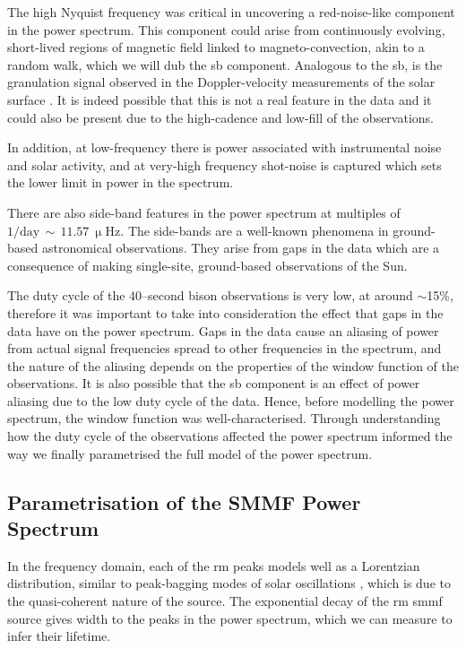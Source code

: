 The high Nyquist frequency was critical in uncovering a red-noise-like component in the power spectrum. This component could arise from continuously evolving, short-lived regions of magnetic field linked to magneto-convection, akin to a random walk, which we will dub the \gls{sb} component. Analogous to the \gls{sb}, is the granulation signal observed in the Doppler-velocity measurements of the solar surface \citep{basu_asteroseismic_2017}. It is indeed possible that this is not a real feature in the data and it could also be present due to the high-cadence and low-fill of the observations.

In addition, at low-frequency there is power associated with instrumental noise and solar activity, and at very-high frequency shot-noise is captured which sets the lower limit in power in the spectrum. 

There are also side-band features in the power spectrum at multiples of $1/\mathrm{day}\,\sim\,11.57~\upmu\mathrm{Hz}$. The side-bands are a well-known phenomena in ground-based astronomical observations. They arise from gaps in the data which are a consequence of making single-site, ground-based observations of the Sun.

The duty cycle of the 40--second \gls{bison} observations is very low, at around $\sim$15\%, therefore it was important to take into consideration the effect that gaps in the data have on the power spectrum. Gaps in the data cause an aliasing of power from actual signal frequencies spread to other frequencies in the spectrum, and the nature of the aliasing depends on the properties of the window function of the observations. It is also possible that the \gls{sb} component is an effect of power aliasing due to the low duty cycle of the data. Hence, before modelling the power spectrum, the window function was well-characterised. Through understanding how the duty cycle of the observations affected the power spectrum informed the way we finally parametrised the full model of the power spectrum.


\subsection{Parametrisation of the SMMF Power Spectrum}

In the frequency domain, each of the \gls{rm} peaks models well as a Lorentzian distribution, similar to peak-bagging modes of solar oscillations \citep{handberg_bayesian_2011, davies_low-frequency_2014}, which is due to the quasi-coherent nature of the source. The exponential decay of the \gls{rm} \gls{smmf} source gives width to the peaks in the power spectrum, which we can measure to infer their lifetime.


